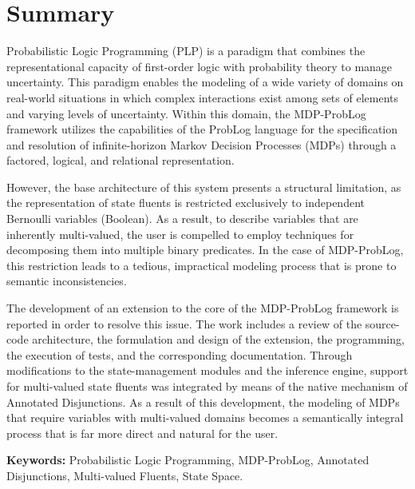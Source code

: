 \documentclass[12pt]{article}
\begin{document}

\clearpage
\section*{\centering Summary}

Probabilistic Logic Programming (PLP) is a paradigm that combines the representational capacity of first-order logic with probability theory to manage uncertainty. This paradigm enables the modeling of a wide variety of domains on real-world situations in which complex interactions exist among sets of elements and varying levels of uncertainty. Within this domain, the MDP-ProbLog framework utilizes the capabilities of the ProbLog language for the specification and resolution of infinite-horizon Markov Decision Processes (MDPs) through a factored, logical, and relational representation.

However, the base architecture of this system presents a structural limitation, as the representation of state fluents is restricted exclusively to independent Bernoulli variables (Boolean). As a result, to describe variables that are inherently multi-valued, the user is compelled to employ techniques for decomposing them into multiple binary predicates. In the case of MDP-ProbLog, this restriction leads to a tedious, impractical modeling process that is prone to semantic inconsistencies.

The development of an extension to the core of the MDP-ProbLog framework is reported in order to resolve this issue. The work includes a review of the source-code architecture, the formulation and design of the extension, the programming, the execution of tests, and the corresponding documentation. Through modifications to the state-management modules and the inference engine, support for multi-valued state fluents was integrated by means of the native mechanism of Annotated Disjunctions. As a result of this development, the modeling of MDPs that require variables with multi-valued domains becomes a semantically integral process that is far more direct and natural for the user.

\vspace{1cm}
\textbf{Keywords:} Probabilistic Logic Programming, MDP-ProbLog, Annotated Disjunctions, Multi-valued Fluents, State Space.
\end{document}
